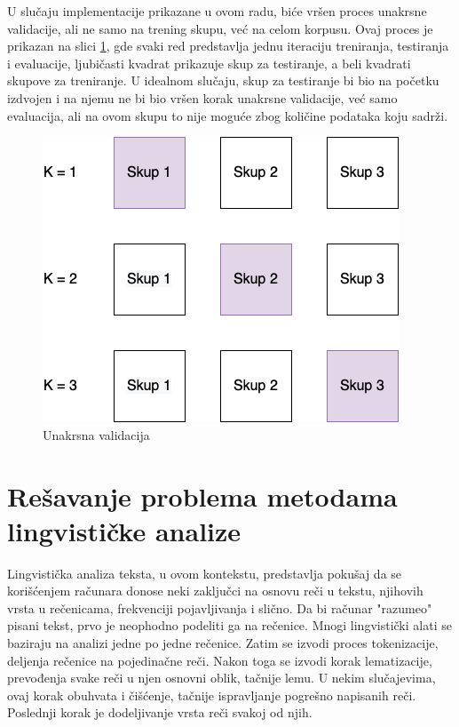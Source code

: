 \documentclass[12pt,oneside]{memoir}
\begin{document}
U slučaju implementacije prikazane u ovom radu,  biće vršen proces unakrsne validacije, ali ne samo na trening skupu, već na celom korpusu.  Ovaj proces je prikazan na slici \ref{img:K_cross_validation},  gde svaki red predstavlja jednu iteraciju treniranja, testiranja i evaluacije, ljubičasti kvadrat prikazuje skup za testiranje, a beli kvadrati skupove za treniranje.  U idealnom slučaju, skup za testiranje bi bio na početku izdvojen i na njemu ne bi bio vršen korak unakrsne validacije, već samo evaluacija, ali na ovom skupu to nije moguće zbog količine podataka koju sadrži. 


\begin{figure}[h!]
\centering
\includegraphics[width=.7\textwidth]{images/K_cross_validation.png}
\caption{Unakrsna validacija}
\label{img:K_cross_validation}
\end{figure}


\chapter{Rešavanje problema metodama lingvističke analize}
\label{poglavlja:ling}

Lingvistička analiza teksta, u ovom kontekstu, predstavlja pokušaj da se korišćenjem računara donose neki zaključci na osnovu reči u tekstu, njihovih vrsta u rečenicama, frekvenciji pojavljivanja i slično. Da bi računar "razumeo" pisani tekst, prvo je neophodno podeliti ga na rečenice. Mnogi lingvistički alati se baziraju na analizi jedne po jedne rečenice. Zatim se izvodi proces tokenizacije, deljenja rečenice na pojedinačne reči. Nakon toga se izvodi korak lematizacije, prevođenja svake reči u njen osnovni oblik, tačnije lemu. U nekim slučajevima, ovaj korak obuhvata i čišćenje, tačnije ispravljanje pogrešno napisanih reči. Poslednji korak je dodeljivanje vrsta reči svakoj od njih.
\end{document}
